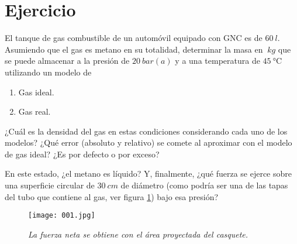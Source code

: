 \section{Ejercicio}\label{ej:Chap03Ejercicio04}

El tanque de gas combustible de un automóvil equipado con GNC es de $\SI{60}{l}$. Asumiendo que el gas es metano en su totalidad, determinar la masa en $\SI{}{kg}$ que se puede almacenar a la presión de $\SI{20}{bar(a)}$ y a una temperatura de $\SI{45}{\celsius}$ utilizando un modelo de
\begin{enumerate}
    \item Gas ideal.
    \item Gas real.
\end{enumerate}
¿Cuál es la densidad del gas en estas condiciones considerando cada uno de los modelos? ¿Qué error (absoluto y relativo) se comete al aproximar con el modelo de gas ideal? ¿Es por defecto o por exceso?

En este estado, ¿el metano es líquido? Y, finalmente, ¿qué fuerza se ejerce sobre una superficie circular de $\SI{30}{cm}$ de diámetro (como podría ser una de las tapas del tubo que contiene al gas, ver figura \ref{im:Chap03-001}) bajo esa presión?

\begin{figure}[ht]
\centerline{\texttt{[image: 001.jpg]}}
\caption{\textit{La fuerza neta se obtiene con el área proyectada del casquete.}}
\label{im:Chap03-001}
\end{figure}